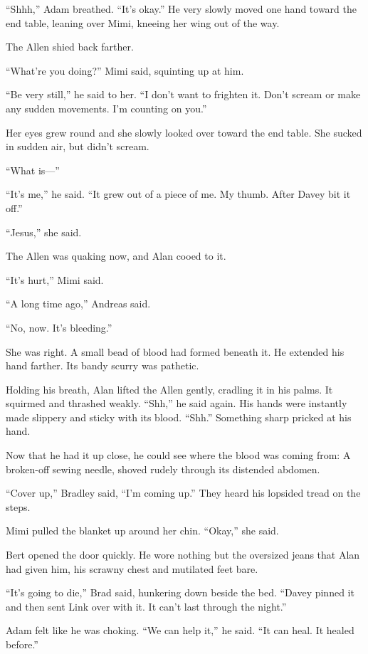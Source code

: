 ``Shhh,'' Adam breathed.  ``It's okay.'' He very slowly moved one hand
toward the end table, leaning over Mimi, kneeing her wing out of the
way. 

The Allen shied back farther. 

``What're you doing?'' Mimi said, squinting up at him.

``Be very still,'' he said to her.  ``I don't want to frighten it. 
Don't scream or make any sudden movements.  I'm counting on you.''

Her eyes grew round and she slowly looked over toward the end table. 
She sucked in sudden air, but didn't scream.

``What is---''

``It's me,'' he said.  ``It grew out of a piece of me.  My thumb. 
After Davey bit it off.''

``Jesus,'' she said.

The Allen was quaking now, and Alan cooed to it. 

``It's hurt,'' Mimi said.

``A long time ago,'' Andreas said.

``No, now.  It's bleeding.''

She was right.  A small bead of blood had formed beneath it.  He
extended his hand farther.  Its bandy scurry was pathetic.

Holding his breath, Alan lifted the Allen gently, cradling it in his
palms.  It squirmed and thrashed weakly.  ``Shh,'' he said again.  His
hands were instantly made slippery and sticky with its blood. 
``Shh.'' Something sharp pricked at his hand.

Now that he had it up close, he could see where the blood was coming
from:  A broken-off sewing needle, shoved rudely through its distended
abdomen.

``Cover up,'' Bradley said, ``I'm coming up.'' They heard his lopsided
tread on the steps.

Mimi pulled the blanket up around her chin.  ``Okay,'' she said.

Bert opened the door quickly.  He wore nothing but the oversized jeans
that Alan had given him, his scrawny chest and mutilated feet bare.

``It's going to die,'' Brad said, hunkering down beside the bed. 
``Davey pinned it and then sent Link over with it.  It can't last
through the night.''

Adam felt like he was choking.  ``We can help it,'' he said.  ``It can
heal.  It healed before.''

